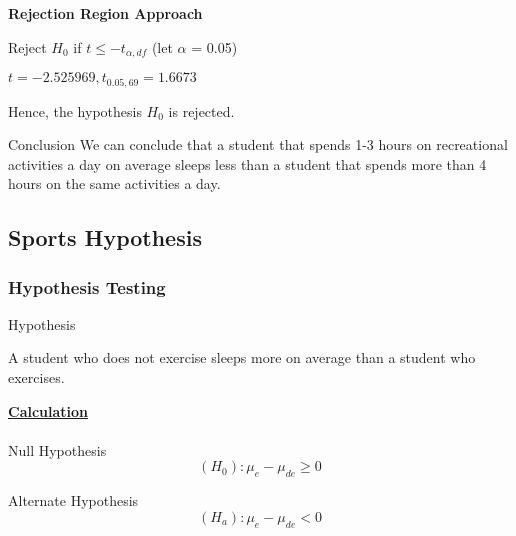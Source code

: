 \documentclass[11pt,]{beamer}
\begin{document}
\begin{frame}

    \textbf{Rejection Region Approach}
    
    Reject $H_0$ if $t \leq -t_{\alpha, df}$ (let $\alpha$ = 0.05)
    
    \bigskip
    
    $t = -2.525969, t_{0.05, 69} = 1.6673$ 
    
    \bigskip
    
    Hence, the hypothesis $H_{0}$ is rejected. 
    
    \bigskip
    
    \begin{block}{Conclusion}
    We can conclude that a student that spends 1-3 hours on recreational activities a day on average sleeps less than a student that spends more than 4 hours on the same activities a day. 
    \end{block}
    
\end{frame}


\subsection{Sports Hypothesis}

\begin{frame}
\frametitle{Hypothesis Testing}

\begin{block}{Hypothesis}

A student who does not exercise sleeps more on average than a student who exercises. 

\end{block}

    \textbf{\underline{Calculation}}\\
    \\
    Null Hypothesis
    \begin{equation}
         (H_0) :  \mu_{e} - \mu_{de} \geq 0
    \end{equation}
    
    \bigskip
    
    Alternate Hypothesis
    \begin{equation}
        (H_a) : \mu_{e} - \mu_{de} < 0
    \end{equation}

\end{frame}
\end{document}
